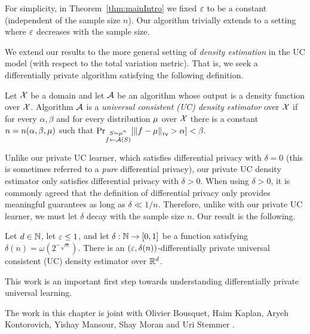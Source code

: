 \documentclass[12pt,a4paper,oneside,onecolumn]{book}
\begin{document}
\begin{remark}
For simplicity, in Theorem~\ref{thm:mainIntro} we fixed $\varepsilon$ to be a constant (independent of the sample size $n$). Our algorithm trivially extends to a setting where $\varepsilon$ decreases with the sample size.
\end{remark}

We extend our results to the more general setting of {\em density estimation} in the UC model (with respect to the total variation metric). That is, we seek a differentially private algorithm satisfying the following definition.

\begin{definition}\label{def:introUCinformal}
Let $\mathcal{X}$ be a domain and let $\mathcal{A}$ be an algorithm whose output is a density function over $\mathcal{X}$. Algorithm $\mathcal{A}$ is a {\em universal consistent (UC) density estimator} over $\mathcal{X}$ if for every $\alpha,\beta$ and for every distribution $\mu$ over $\mathcal{X}$ there is a constant $n=n(\alpha,\beta,\mu)$ such that
$
\Pr_{\substack{S\sim\mu^n\\f\leftarrow\mathcal{A}(S)}}[\left\lVert f - \mu\right\rVert_{\textup{\tiny\textsf{TV}}}
>\alpha]<\beta.
$
\end{definition}

Unlike our private UC learner, which satisfies differential privacy with $\delta=0$ (this is sometimes referred to a {\em pure} differential privacy), our private UC density estimator only satisfies differential privacy with $\delta>0$. When using $\delta>0$, it is commonly agreed that the definition of differential privacy only provides meaningful guarantees as long as $\delta\ll1/n$. Therefore, unlike with our private UC learner, we must let $\delta$ decay with the sample size $n$. Our result is the following.

\begin{theorem}\label{thm:introDE}
Let $d\in\mathbb{N}$, let $\varepsilon\leq1$, and let $\delta:\mathbb{N}\rightarrow[0,1]$ be a function satisfying $\delta(n)=\omega(2^{-\sqrt{n}})$. There is an $(\varepsilon,\delta(n))$-differentially private universal consistent (UC) density estimator over $\mathbb{R}^d$.
\end{theorem}

This work is an important first step towards understanding differentially private universal learning. 

The work in this chapter is joint with Olivier Bousquet, Haim Kaplan, Aryeh Kontorovich, Yishay Mansour, Shay Moran and Uri Stemmer \citeyear{https://doi.org/10.48550/arxiv.2212.04216}.
\end{document}
